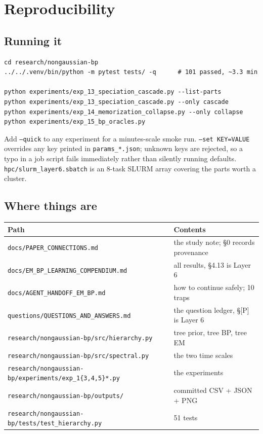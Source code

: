 \documentclass[11pt]{article}
\theoremstyle{remark}
\newcommand{\code}[1]{\texttt{\small #1}}
\begin{document}
\section{Reproducibility}

\subsection{Running it}

\begin{verbatim}
cd research/nongaussian-bp
../../.venv/bin/python -m pytest tests/ -q      # 101 passed, ~3.3 min

python experiments/exp_13_speciation_cascade.py --list-parts
python experiments/exp_13_speciation_cascade.py --only cascade
python experiments/exp_14_memorization_collapse.py --only collapse
python experiments/exp_15_bp_oracles.py
\end{verbatim}

Add \code{--quick} to any experiment for a minutes-scale smoke run.
\code{--set KEY=VALUE} overrides any key printed in \code{params\_*.json};
unknown keys are rejected, so a typo in a job script fails immediately rather
than silently running defaults. \code{hpc/slurm\_layer6.sbatch} is an 8-task
SLURM array covering the parts worth a cluster.

\subsection{Where things are}

\begin{center}
\begin{tabular}{@{}ll@{}}
\toprule
Path & Contents \\
\midrule
\code{docs/PAPER\_CONNECTIONS.md} & the study note; \S0 records provenance \\
\code{docs/EM\_BP\_LEARNING\_COMPENDIUM.md} & all results, \S4.13 is Layer 6 \\
\code{docs/AGENT\_HANDOFF\_EM\_BP.md} & how to continue safely; 10 traps \\
\code{questions/QUESTIONS\_AND\_ANSWERS.md} & the question ledger, \S[P] is Layer 6 \\
\code{research/nongaussian-bp/src/hierarchy.py} & tree prior, tree BP, tree EM \\
\code{research/nongaussian-bp/src/spectral.py} & the two time scales \\
\code{research/nongaussian-bp/experiments/exp\_1\{3,4,5\}*.py} & the experiments \\
\code{research/nongaussian-bp/outputs/} & committed CSV + JSON + PNG \\
\code{research/nongaussian-bp/tests/test\_hierarchy.py} & 51 tests \\
\bottomrule
\end{tabular}
\end{center}
\end{document}
